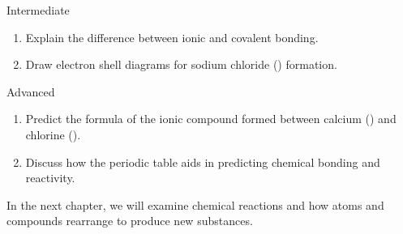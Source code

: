 \begin{tieredquestions}{Intermediate}
\begin{enumerate}
    \item Explain the difference between ionic and covalent bonding.
    \item Draw electron shell diagrams for sodium chloride () formation.
\end{enumerate}
\end{tieredquestions}

\begin{tieredquestions}{Advanced}
\begin{enumerate}
    \item Predict the formula of the ionic compound formed between calcium () and chlorine ().
    \item Discuss how the periodic table aids in predicting chemical bonding and reactivity.
\end{enumerate}
\end{tieredquestions}

In the next chapter, we will examine chemical reactions and how atoms and compounds rearrange to produce new substances.
